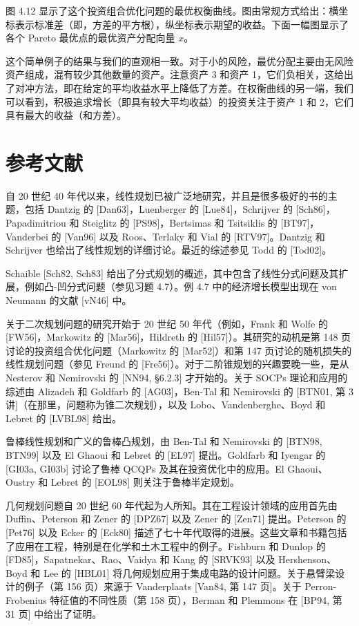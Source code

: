 \documentclass[UTF8, 12pt, fontset=fandol, oneside]{ctexart}
\begin{document}
图 4.12 显示了这个投资组合优化问题的最优权衡曲线。图由常规方式给出：横坐标表示标准差（即，方差的平方根），纵坐标表示期望的收益。下面一幅图显示了各个 Pareto 最优点的最优资产分配向量 $x$。

这个简单例子的结果与我们的直观相一致。对于小的风险，最优分配主要由无风险资产组成，混有较少其他数量的资产。注意资产 3 和资产 1，它们负相关，这给出了对冲方法，即在给定的平均收益水平上降低了方差。在权衡曲线的另一端，我们可以看到，积极追求增长（即具有较大平均收益）的投资关注于资产 1 和 2，它们具有最大的收益（和方差）。

\section*{参考文献}

自 20 世纪 40 年代以来，线性规划已被广泛地研究，并且是很多极好的书的主题，包括 Dantzig 的 [Dan63]，Luenberger 的 [Lue84]，Schrijver 的 [Sch86]，Papadimitriou 和 Steiglitz 的 [PS98]，Bertsimas 和 Tsitsiklis 的 [BT97]，Vanderbei 的 [Van96] 以及 Roos、Terlaky 和 Vial 的 [RTV97]。Dantzig 和 Schrijver 也给出了线性规划的详细讨论。最近的综述参见 Todd 的 [Tod02]。

Schaible [Sch82, Sch83] 给出了分式规划的概述，其中包含了线性分式问题及其扩展，例如凸-凹分式问题（参见习题 4.7）。例 4.7 中的经济增长模型出现在 von Neumann 的文献 [vN46] 中。

关于二次规划问题的研究开始于 20 世纪 50 年代（例如，Frank 和 Wolfe 的 [FW56]，Markowitz 的 [Mar56]，Hildreth 的 [Hil57]）。其研究的动机是第 148 页讨论的投资组合优化问题（Markowitz 的 [Mar52]）和第 147 页讨论的随机损失的线性规划问题（参见 Freund 的 [Fre56]）。对于二阶锥规划的兴趣要晚一些，是从 Nesterov 和 Nemirovski 的 [NN94, \S 6.2.3] 才开始的。关于 SOCPs 理论和应用的综述由 Alizadeh 和 Goldfarb 的 [AG03]，Ben-Tal 和 Nemirovski 的 [BTN01, 第 3 讲]（在那里，问题称为锥二次规划），以及 Lobo、Vandenberghe、Boyd 和 Lebret 的 [LVBL98] 给出。

鲁棒线性规划和广义的鲁棒凸规划，由 Ben-Tal 和 Nemirovski 的 [BTN98, BTN99] 以及 El Ghaoui 和 Lebret 的 [EL97] 提出。Goldfarb 和 Iyengar 的 [GI03a, GI03b] 讨论了鲁棒 QCQPs 及其在投资优化中的应用。El Ghaoui、Oustry 和 Lebret 的 [EOL98] 则关注于鲁棒半定规划。

几何规划问题自 20 世纪 60 年代起为人所知。其在工程设计领域的应用首先由 Duffin、Peterson 和 Zener 的 [DPZ67] 以及 Zener 的 [Zen71] 提出。Peterson 的 [Pet76] 以及 Ecker 的 [Eck80] 描述了七十年代取得的进展。这些文章和书籍包括了应用在工程，特别是在化学和土木工程中的例子。Fishburn 和 Dunlop 的 [FD85]，Sapatnekar、Rao、Vaidya 和 Kang 的 [SRVK93] 以及 Hershenson、Boyd 和 Lee 的 [HBL01] 将几何规划应用于集成电路的设计问题。关于悬臂梁设计的例子（第 156 页）来源于 Vanderplaats [Van84, 第 147 页]。关于 Perron-Frobenius 特征值的不同性质（第 158 页），Berman 和 Plemmons 在 [BP94, 第 31 页] 中给出了证明。
\end{document}
